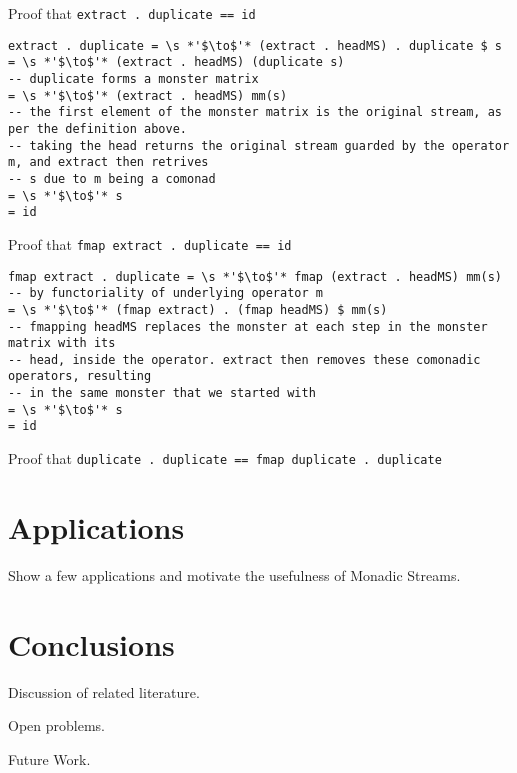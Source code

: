 \documentclass{article}
\begin{document}
Proof that \verb+extract . duplicate == id+

\begin{lstlisting}
extract . duplicate = \s *'$\to$'* (extract . headMS) . duplicate $ s
= \s *'$\to$'* (extract . headMS) (duplicate s)
-- duplicate forms a monster matrix
= \s *'$\to$'* (extract . headMS) mm(s)
-- the first element of the monster matrix is the original stream, as per the definition above.
-- taking the head returns the original stream guarded by the operator m, and extract then retrives 
-- s due to m being a comonad
= \s *'$\to$'* s
= id
\end{lstlisting}

Proof that \verb+fmap extract . duplicate == id+

\begin{lstlisting}
fmap extract . duplicate = \s *'$\to$'* fmap (extract . headMS) mm(s)
-- by functoriality of underlying operator m
= \s *'$\to$'* (fmap extract) . (fmap headMS) $ mm(s)
-- fmapping headMS replaces the monster at each step in the monster matrix with its
-- head, inside the operator. extract then removes these comonadic operators, resulting 
-- in the same monster that we started with
= \s *'$\to$'* s
= id
\end{lstlisting}

Proof that \verb+duplicate . duplicate == fmap duplicate . duplicate+

\section{Applications}

Show a few applications and motivate the usefulness of Monadic Streams.

\section{Conclusions}

Discussion of related literature.

Open problems.

Future Work.


\end{document}
